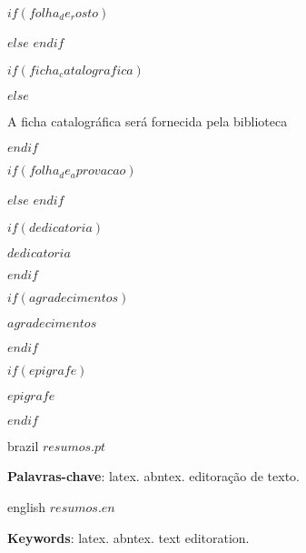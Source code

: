\documentclass[
	oldfontcommands,
	sumario=abnt-6027-2012,
	12pt,
	openright,
	oneside,
	a4paper,
	english,
	english
	]{imecc-unicamp}
\begin{document}
\frenchspacing

\pretextual
\imprimirprimeirafolha

$if(folha_de_rosto)$
  \begin{folhaderosto}
  
  \end{folhaderosto}
$else$
  \imprimirfolhaderosto
$endif$

\begin{fichacatalografica}
  $if(ficha_catalografica)$
    
  $else$
    \begin{center}
  {\ABNTEXchapterfont\large A ficha catalográfica será fornecida pela biblioteca}
    \end{center}
  $endif$
\end{fichacatalografica}

\begin{folhadeaprovacao}
  $if(folha_de_aprovacao)$
    
  $else$
  $endif$
\end{folhadeaprovacao}

$if(dedicatoria)$
  \begin{dedicatoria}
     \vspace*{\fill}
     \centering
     \noindent
     \textit{
        $dedicatoria$
     }
     \vspace*{\fill}
  \end{dedicatoria}
$endif$

$if(agradecimentos)$
  \begin{agradecimentos}
  $agradecimentos$
  \end{agradecimentos}
$endif$

$if(epigrafe)$
  \begin{epigrafe}
      \vspace*{\fill}
      \begin{flushright}
  	\textit{$epigrafe$}
      \end{flushright}
  \end{epigrafe}
  $endif$

\setlength{\absparsep}{18pt}
\begin{resumo}[Resumo]
 \begin{otherlanguage*}{brazil}
    $resumos.pt$

    \textbf{Palavras-chave}: latex. abntex. editoração de texto.
 \end{otherlanguage*}
\end{resumo}
\begin{resumo}[Abstract]
 \begin{otherlanguage*}{english}
    $resumos.en$

    \textbf{Keywords}: latex. abntex. text editoration.
 \end{otherlanguage*}
\end{resumo}
\end{document}
